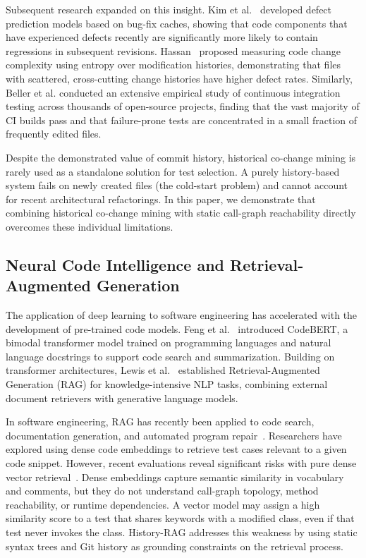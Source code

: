 \documentclass[12pt,onecolumn,draftclsnofoot]{IEEEtran}
\begin{document}
Subsequent research expanded on this insight. Kim et al.~\cite{kim2007predicting} developed defect prediction models based on bug-fix caches, showing that code components that have experienced defects recently are significantly more likely to contain regressions in subsequent revisions. Hassan~\cite{gethers2012integrated} proposed measuring code change complexity using entropy over modification histories, demonstrating that files with scattered, cross-cutting change histories have higher defect rates. Similarly, Beller et al. conducted an extensive empirical study of continuous integration testing across thousands of open-source projects, finding that the vast majority of CI builds pass and that failure-prone tests are concentrated in a small fraction of frequently edited files.

Despite the demonstrated value of commit history, historical co-change mining is rarely used as a standalone solution for test selection. A purely history-based system fails on newly created files (the cold-start problem) and cannot account for recent architectural refactorings. In this paper, we demonstrate that combining historical co-change mining with static call-graph reachability directly overcomes these individual limitations.

\subsection{Neural Code Intelligence and Retrieval-Augmented Generation}
The application of deep learning to software engineering has accelerated with the development of pre-trained code models. Feng et al.~\cite{feng2020codebert} introduced CodeBERT, a bimodal transformer model trained on programming languages and natural language docstrings to support code search and summarization. Building on transformer architectures, Lewis et al.~\cite{lewis2020retrieval} established Retrieval-Augmented Generation (RAG) for knowledge-intensive NLP tasks, combining external document retrievers with generative language models.

In software engineering, RAG has recently been applied to code search, documentation generation, and automated program repair~\cite{gao2024retrieval}. Researchers have explored using dense code embeddings to retrieve test cases relevant to a given code snippet. However, recent evaluations reveal significant risks with pure dense vector retrieval~\cite{zhou2023devops}. Dense embeddings capture semantic similarity in vocabulary and comments, but they do not understand call-graph topology, method reachability, or runtime dependencies. A vector model may assign a high similarity score to a test that shares keywords with a modified class, even if that test never invokes the class. History-RAG addresses this weakness by using static syntax trees and Git history as grounding constraints on the retrieval process.
\end{document}
